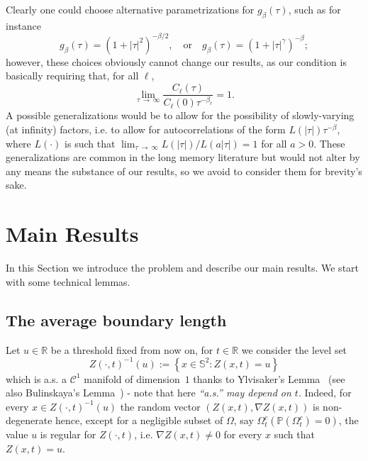 \documentclass[10pt]{amsart}
\theoremstyle{definition}\newtheorem{defi}[theo]{Definition}\newtheorem{rema}[theo]{Remark}\newtheorem{exam}[theo]{Example}\newtheorem{exem}[theo]{Example}\newtheorem{nota}[theo]{Notation}
\newcommand{\clC}{\mathcal{C}}
\newcommand{\bbS}{\mathbb{S}}
\newcommand{\bbR}{\mathbb{R}}
\newcommand{\bbP}{\mathbb{P}}
\begin{document}
Clearly one could choose alternative parametrizations for $g_\beta(\tau)$, such as for instance
\begin{equation*}
g_\beta(\tau) =\left(1 + |\tau|^2\right)^{-\beta/2},\quad \text{or} \quad g_\beta(\tau) =\left(1 + |\tau|^{\gamma}\right)^{-\beta};
\end{equation*}
however, these choices obviously cannot change our results, as our condition is basically requiring that, for all $\ell$,
\begin{equation*}
\lim_{\tau\,\rightarrow\,\infty}\frac{C_\ell(\tau)}{C_\ell(0)\tau^{-\beta_\ell}} =1.
\end{equation*}
A possible generalizations would be to allow for the possibility of slowly-varying (at infinity) factors, i.e. to allow for autocorrelations of the form $ L(|\tau|)\tau^{-\beta}$, where $L(\cdot)$ is such that $\lim_{\tau\,\rightarrow\,\infty} L(|\tau|)/L(a|\tau|)=1$ for all $a>0$. These generalizations are common in the long memory literature but would not alter by any means the substance of our results, so we avoid to consider them for brevity's sake.



\section{Main Results}\label{sec-MR}

In this Section we introduce the problem and describe our main results. We start with some technical lemmas.

\subsection{The average boundary length}
\label{subsec-object}

Let $u\in \bbR$ be a threshold fixed from now on, for $t\in \bbR$ we consider the level set
\begin{equation*}
Z(\cdot, t)^{-1}(u):=\left\{ x\in \bbS^2 : Z(x,t) = u\right\}
\end{equation*}
which is a.s. a $\clC^1$ manifold of dimension~$1$ thanks to Ylvisaker's Lemma~\cite[Theorem~1.21]{AW:09} (see also Bulinskaya's Lemma~\cite[Proposition~1.20]{AW:09}) - note that here \emph{``a.s.'' may depend on $t$}. Indeed, for every $x\in Z(\cdot, t)^{-1}(u)$ the random vector $(Z(x,t), \nabla Z(x,t))$ is non-degenerate hence, except for a negligible subset of $\Omega$, say $\Omega_t^c (\bbP(\Omega_t^c)=0)$, the value $u$ is regular for $Z(\cdot, t)$, i.e. $\nabla Z(x, t)\ne 0$ for every $x$ such that $Z(x,t)=u$.
\end{document}
